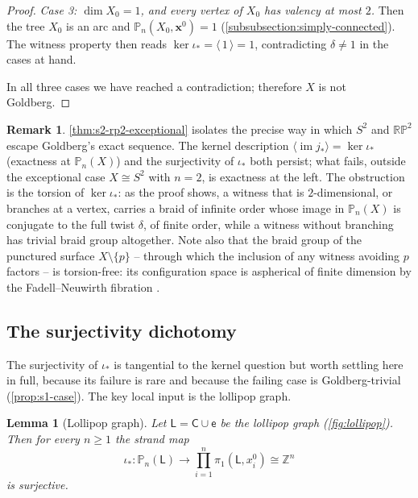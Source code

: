 \documentclass[reqno]{amsart}
\newtheorem{lemma}[theorem]{Lemma}
\theoremstyle{definition}
\newtheorem{remark}[theorem]{Remark}
\newcommand\bfx{\mathbf{x}}
\newcommand{\PB}{\mathbb{P}}
\newcommand{\im}{\operatorname{im}}
\newcommand{\Z}{\mathbb{Z}}
\newcommand{\RP}{\mathbb{RP}}
\newcommand{\co}[1]{\mathopen{\langle}#1\mathclose{\rangle}} %
\newcommand{\base}{\bfx^0}
\newcommand{\Lollipop}{\mathsf{L}}
\numberwithin{equation}{section}
\begin{document}
\begin{proof}
\emph{Case 3: \(\dim X_0=1\), and every vertex of \(X_0\)
has valency at most \(2\).} Then the tree \(X_0\) is an arc and
\(\PB_n(X_0,\base)=1\)
(\cref{subsubsection:simply-connected}). The witness property
then reads \(\ker\iota_\ast=\co{\,1\,}=1\), contradicting
\(\delta\neq1\) in the cases at hand.

In all three cases we have reached a contradiction; therefore
\(X\) is not Goldberg.
\end{proof}

\begin{remark}\label{rem:s2-rp2-exceptional}
\cref{thm:s2-rp2-exceptional} isolates the precise way in
which \(S^2\) and \(\RP^2\) escape Goldberg's exact sequence. The
kernel description \(\co{\im j_\ast}=\ker\iota_\ast\) (exactness at
\(\PB_n(X)\)) and the surjectivity of \(\iota_\ast\) both persist;
what fails, outside the exceptional case \(X\cong S^2\) with
\(n=2\), is exactness at the left. The obstruction is the
torsion of \(\ker\iota_\ast\): as the proof shows, a witness
that is \(2\)-dimensional, or branches at a vertex, carries a
braid of infinite order whose image in \(\PB_n(X)\) is
conjugate to the full twist \(\delta\), of finite order, while
a witness without branching has trivial braid group altogether.
Note also that the braid group of the punctured surface
\(X\setminus\{p\}\) -- through which the inclusion of any
witness avoiding \(p\) factors -- is torsion-free: its
configuration space is aspherical of finite dimension by the
Fadell--Neuwirth fibration \cite{FadellNeuwirth1962}.
\end{remark}


\subsection{The surjectivity dichotomy}
\label{ssec:surj-dichotomy}

The surjectivity of \(\iota_\ast\) is tangential
to the kernel question but worth settling here in full, because
its failure is rare and because the failing case is Goldberg-trivial
(\cref{prop:s1-case}). The key local input is the
lollipop graph.

\begin{lemma}[Lollipop graph]\label{lem:lollipop}
Let \(\Lollipop = \mathsf{C}\cup \mathsf{e}\) be the lollipop graph
(\cref{fig:lollipop}). Then for every \(n\geq 1\) the strand
map
\[
\iota_\ast \colon \PB_n(\Lollipop)\longrightarrow
\prod_{i=1}^n\pi_1(\Lollipop,x_i^0) \cong \Z^n
\]
is surjective.
\end{lemma}
\end{document}
